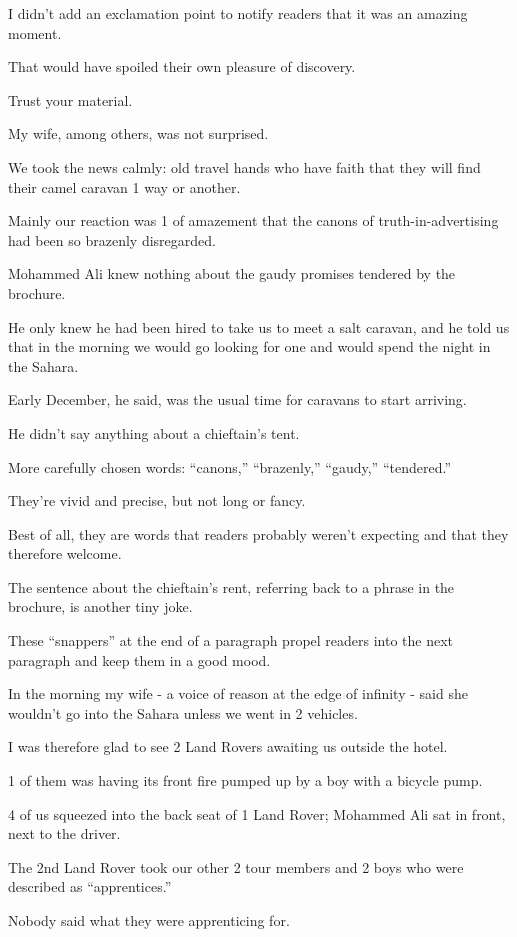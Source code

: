 \documentclass{book}
\numberwithin{equation}{section}
\begin{document}
I didn't add an exclamation point to notify readers that it was an amazing moment.

That would have spoiled their own pleasure of discovery.

Trust your material.

%
My wife, among others, was not surprised.

We took the news calmly: old travel hands who have faith that they will find their camel caravan 1 way or another.

Mainly our reaction was 1 of amazement that the canons of truth-in-advertising had been so brazenly disregarded.

Mohammed Ali knew nothing about the gaudy promises tendered by the brochure.

He only knew he had been hired to take us to meet a salt caravan, and he told us that in the morning we would go looking for one and would spend the night in the Sahara.

Early December, he said, was the usual time for caravans to start arriving.

He didn't say anything about a chieftain's tent.

%
More carefully chosen words: ``canons,'' ``brazenly,'' ``gaudy,'' ``tendered.''

They're vivid and precise, but not long or fancy.

Best of all, they are words that readers probably weren't expecting and that they therefore welcome.

The sentence about the chieftain's rent, referring back to a phrase in the brochure, is another tiny joke.

These ``snappers'' at the end of a paragraph propel readers into the next paragraph and keep them in a good mood.

%
In the morning my wife - a voice of reason at the edge of infinity - said she wouldn't go into the Sahara unless we went in 2 vehicles.

I was therefore glad to see 2 Land Rovers awaiting us outside the hotel.

1 of them was having its front fire pumped up by a boy with a bicycle pump.

4 of us squeezed into the back seat of 1 Land Rover; Mohammed Ali sat in front, next to the driver.

The 2nd Land Rover took our other 2 tour members and 2 boys who were described as ``apprentices.''

Nobody said what they were apprenticing for.
\end{document}
